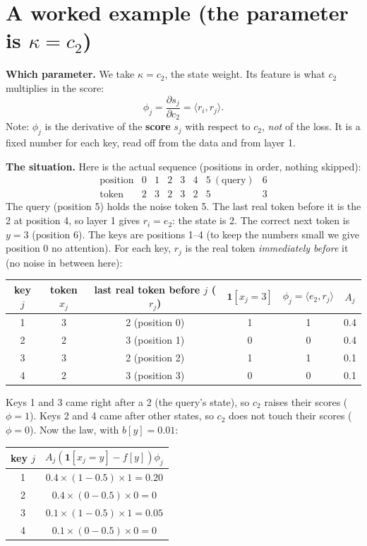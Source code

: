 \documentclass[11pt]{article}
\newcommand{\1}{\mathbf{1}}
\begin{document}
\section{A worked example (the parameter is $\kappa=c_2$)}
\textbf{Which parameter.} We take $\kappa=c_2$, the state weight. Its feature is what $c_2$ multiplies in the score:
\[
\phi_j=\frac{\partial s_j}{\partial c_2}=\langle r_i,r_j\rangle .
\]
Note: $\phi_j$ is the derivative of the \textbf{score} $s_j$ with respect to $c_2$, \emph{not} of the loss. It is a fixed
number for each key, read off from the data and from layer 1.

\textbf{The situation.} Here is the actual sequence (positions in order, nothing skipped):
\[
\begin{array}{c|cccccc|c}
\text{position} & 0 & 1 & 2 & 3 & 4 & 5\ (\text{query}) & 6\\\hline
\text{token} & 2 & 3 & 2 & 3 & 2 & 5 & 3
\end{array}
\]
The query (position 5) holds the noise token 5. The last real token before it is the 2 at position 4, so layer 1
gives $r_i=e_2$: the state is 2. The correct next token is $y=3$ (position 6). The keys are positions 1--4 (to keep
the numbers small we give position 0 no attention). For each key, $r_j$ is the real token \emph{immediately before}
it (no noise in between here):
\begin{center}
\begin{tabular}{cccccc}\toprule
key $j$ & token $x_j$ & last real token before $j$ ($r_j$) & $\1[x_j=3]$ & $\phi_j=\langle e_2,r_j\rangle$ & $A_j$\\\midrule
1 & 3 & 2 (position 0) & 1 & 1 & 0.4\\
2 & 2 & 3 (position 1) & 0 & 0 & 0.4\\
3 & 3 & 2 (position 2) & 1 & 1 & 0.1\\
4 & 2 & 3 (position 3) & 0 & 0 & 0.1\\\bottomrule
\end{tabular}
\end{center}
Keys 1 and 3 came right after a 2 (the query's state), so $c_2$ raises their scores ($\phi=1$). Keys 2 and 4 came after
other states, so $c_2$ does not touch their scores ($\phi=0$). Now the law, with $b[y]=0.01$:
\begin{center}
\begin{tabular}{cc}\toprule
key $j$ & $A_j(\1[x_j=y]-f[y])\phi_j$\\\midrule
1 & $0.4\times(1-0.5)\times1=0.20$\\
2 & $0.4\times(0-0.5)\times0=0$\\
3 & $0.1\times(1-0.5)\times1=0.05$\\
4 & $0.1\times(0-0.5)\times0=0$\\\bottomrule
\end{tabular}
\end{center}
\end{document}
